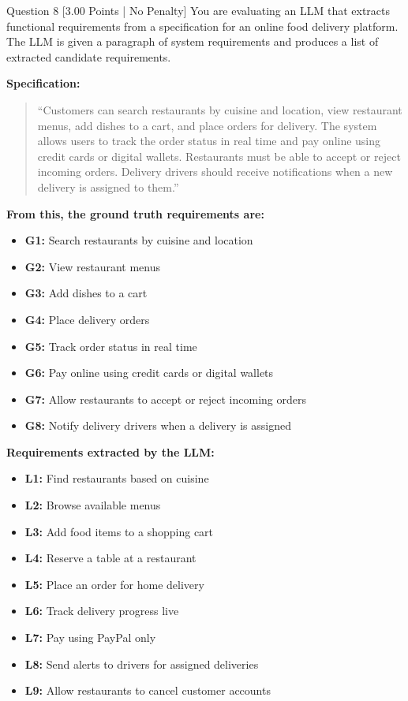 \documentclass[11pt,a4paper]{article}
\begin{document}
\begin{questionbox}{Question 8 \hfill [3.00 Points | No Penalty]}
You are evaluating an LLM that extracts functional requirements from a specification for an online food delivery platform. The LLM is given a paragraph of system requirements and produces a list of extracted candidate requirements.

\noindent\textbf{Specification:}
\begin{quote}
``Customers can search restaurants by cuisine and location, view restaurant menus, add dishes to a cart, and place orders for delivery. The system allows users to track the order status in real time and pay online using credit cards or digital wallets. Restaurants must be able to accept or reject incoming orders. Delivery drivers should receive notifications when a new delivery is assigned to them.''
\end{quote}

\noindent\textbf{From this, the ground truth requirements are:}
\begin{itemize}[noitemsep]
    \item \textbf{G1:} Search restaurants by cuisine and location
    \item \textbf{G2:} View restaurant menus
    \item \textbf{G3:} Add dishes to a cart
    \item \textbf{G4:} Place delivery orders
    \item \textbf{G5:} Track order status in real time
    \item \textbf{G6:} Pay online using credit cards or digital wallets
    \item \textbf{G7:} Allow restaurants to accept or reject incoming orders
    \item \textbf{G8:} Notify delivery drivers when a delivery is assigned
\end{itemize}

\noindent\textbf{Requirements extracted by the LLM:}
\begin{itemize}[noitemsep]
    \item \textbf{L1:} Find restaurants based on cuisine
    \item \textbf{L2:} Browse available menus
    \item \textbf{L3:} Add food items to a shopping cart
    \item \textbf{L4:} Reserve a table at a restaurant
    \item \textbf{L5:} Place an order for home delivery
    \item \textbf{L6:} Track delivery progress live
    \item \textbf{L7:} Pay using PayPal only
    \item \textbf{L8:} Send alerts to drivers for assigned deliveries
    \item \textbf{L9:} Allow restaurants to cancel customer accounts
\end{itemize}


\end{questionbox}
\end{document}

